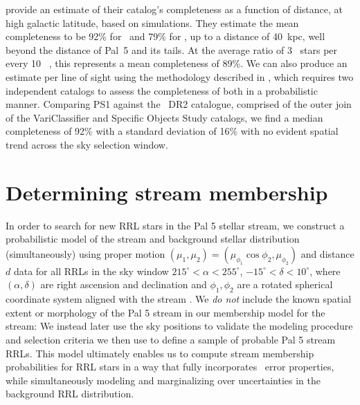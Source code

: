 \documentclass[twocolumn]{aastex63}
\begin{document}
\citet{Sesar:2017b} provide an estimate of their catalog's completeness as a function of distance, at high galactic latitude, based on simulations. They estimate the mean completeness to be 92\% for \rrab~and 79\% for \rrc, up to a distance of 40~kpc, well beyond the distance of Pal~5 and its tails. At the average ratio of 3 \rrc~stars per every 10 \rrab~\citep{Layden:1995}, this represents a mean completeness of 89\%. We can also produce an estimate per line of sight using the methodology described in \citet{Rybizki:2018}, which requires two independent catalogs to assess the completeness of both in a probabilistic manner. Comparing PS1 against the \Gaia~DR2 catalogue, comprised of the outer join of the VariClassifier \citep{Holl2018,Rimoldini2018} and Specific Objects Study \citep{Clementini2018} catalogs, we find a median completeness of 92\% with a standard deviation of 16\% with no evident spatial trend across the sky selection window.

\section{Determining stream membership} \label{sec:membership}

In order to search for new RRL stars in the Pal 5 stellar stream, we construct a probabilistic model of the stream and background stellar distribution (simultaneously) using proper motion $(\mu_1, \mu_2) = (\mu_{\phi_1}\cos\phi_2, \mu_{\phi_2})$ and distance $d$ data for all RRLs in the sky window $215^\circ < \alpha < 255^\circ$, $-15^\circ < \delta < 10^\circ$, where $(\alpha, \delta)$ are right ascension and declination and $\phi_1, \phi_2$ are a rotated spherical coordinate system aligned with the stream \citep{Bonaca:2019}.
We \emph{do not} include the known spatial extent or morphology of the Pal 5 stream in our membership model for the stream: We instead later use the sky positions to validate the modeling procedure and selection criteria we then use to define a sample of probable Pal 5 stream RRLs.
This model ultimately enables us to compute stream membership probabilities for RRL stars in a way that fully incorporates \Gaia\ error properties, while simultaneously modeling and marginalizing over uncertainties in the background RRL distribution.
\end{document}
